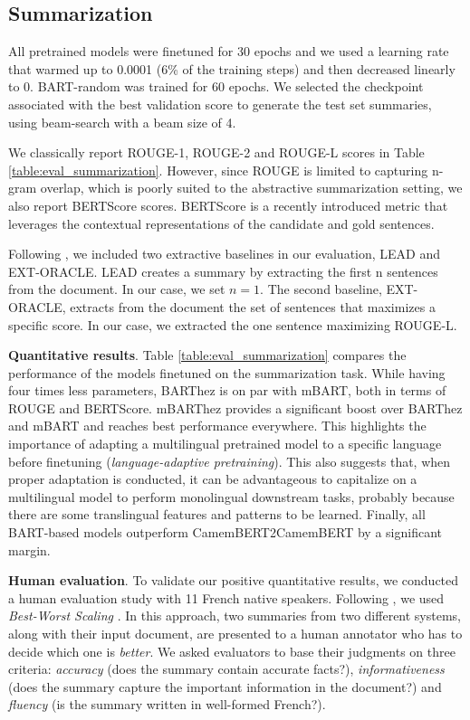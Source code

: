 \documentclass[11pt,a4paper]{article}
\begin{document}
\subsection{Summarization}
All pretrained models were finetuned for 30 epochs and we used a learning rate that warmed up to 0.0001 (6\% of the training steps) and then decreased linearly to 0. BART-random was trained for 60 epochs.
We selected the checkpoint associated with the best validation score to generate the test set summaries, using beam-search with a beam size of 4.

We classically report ROUGE-1, ROUGE-2 and ROUGE-L scores \cite{lin2004rouge} in Table \ref{table:eval_summarization}.
However, since ROUGE is limited to capturing n-gram overlap, which is poorly suited to the abstractive summarization setting, we also report BERTScore scores.
BERTScore \cite{zhang2019bertscore} is a recently introduced metric that leverages the contextual representations of the candidate and gold sentences. 

Following \citet{narayan2018don}, we included two extractive baselines in our evaluation, \textsc{LEAD} and \textsc{EXT-ORACLE}.
\textsc{LEAD} creates a summary by extracting the first n sentences from the document.
In our case, we set $n=1$.
The second baseline, EXT-ORACLE, extracts from the document the set of sentences that maximizes a specific score. In our case, we extracted the one sentence maximizing ROUGE-L.

\noindent \textbf{Quantitative results}.
Table \ref{table:eval_summarization} compares the performance of the models finetuned on the summarization task.
While having four times less parameters, BARThez is on par with mBART, both in terms of ROUGE and BERTScore.
mBARThez provides a significant boost over BARThez and mBART and reaches best performance everywhere.
This highlights the importance of adapting a multilingual pretrained model to a specific language before finetuning (\textit{language-adaptive pretraining}).
This also suggests that, when proper adaptation is conducted, it can be advantageous to capitalize on a multilingual model to perform monolingual downstream tasks, probably because there are some translingual features and patterns to be learned.
Finally, all BART-based models outperform CamemBERT2CamemBERT by a significant margin.

\noindent \textbf{Human evaluation}.
To validate our positive quantitative results, we conducted a human evaluation study with 11 French native speakers.
Following \citet{narayan2018don}, we used \textit{Best-Worst Scaling} \cite{louviere2015best}.
In this approach, two summaries from two different systems, along with their input document, are presented to a human annotator who has to decide which one is \textit{better}.
We asked evaluators to base their judgments on three criteria: \textit{accuracy} (does the summary contain accurate facts?), \textit{informativeness} (does the summary capture the important information in the document?) and \textit{fluency} (is the summary written in well-formed French?).
\end{document}
